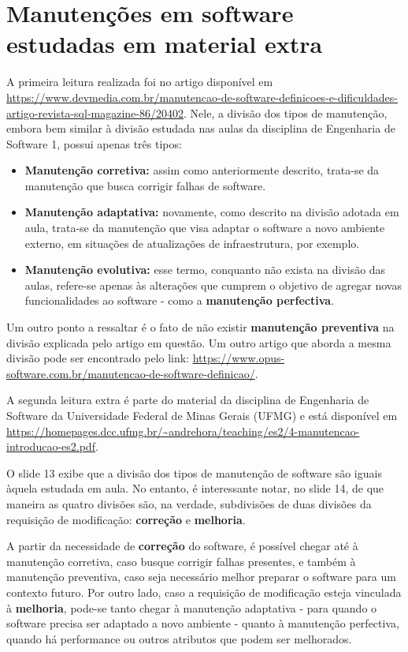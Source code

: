 \section{Manutenções em software estudadas em material extra}
A primeira leitura realizada foi no artigo disponível em \url{https://www.devmedia.com.br/manutencao-de-software-definicoes-e-dificuldades-artigo-revista-sql-magazine-86/20402}.
Nele, a divisão dos tipos de manutenção, embora bem similar à divisão estudada nas aulas da disciplina de Engenharia de Software 1, possui apenas três tipos:
\begin{itemize}
    \item \textbf{Manutenção corretiva:} assim como anteriormente descrito, trata-se da manutenção que busca corrigir falhas de software.
    \item \textbf{Manutenção adaptativa:} novamente, como descrito na divisão adotada em aula, trata-se da manutenção que visa adaptar o software a novo ambiente externo, em situações de atualizações de infraestrutura, por exemplo.
    \item \textbf{Manutenção evolutiva:} esse termo, conquanto não exista na divisão das aulas, refere-se apenas às alterações que cumprem o objetivo de agregar novas funcionalidades ao software - como a \textbf{manutenção perfectiva}.
\end{itemize}
Um outro ponto a ressaltar é o fato de não existir \textbf{manutenção preventiva} na divisão explicada pelo artigo em questão. Um outro artigo que aborda a mesma divisão pode ser encontrado pelo link: \url{https://www.opus-software.com.br/manutencao-de-software-definicao/}.
\newline
\par A segunda leitura extra é parte do material da disciplina de Engenharia de Software da Universidade Federal de Minas Gerais (UFMG) e está disponível em \url{https://homepages.dcc.ufmg.br/~andrehora/teaching/es2/4-manutencao-introducao-es2.pdf}.
\newline
\par O slide 13 exibe que a divisão dos tipos de manutenção de software são iguais àquela estudada em aula. No entanto, é interessante notar, no slide 14, de que maneira as quatro divisões são, na verdade, subdivisões de duas divisões da requisição de modificação: \textbf{correção} e \textbf{melhoria}.
\newline
\par A partir da necessidade de \textbf{correção} do software, é possível chegar até à manutenção corretiva, caso busque corrigir falhas presentes, e também à manutenção preventiva, caso seja necessário melhor preparar o software para um contexto futuro. Por outro lado, caso a requisição de modificação esteja vinculada à \textbf{melhoria}, pode-se tanto chegar à manutenção adaptativa - para quando o software precisa ser adaptado a novo ambiente - quanto à manutenção perfectiva, quando há performance ou outros atributos que podem ser melhorados.
